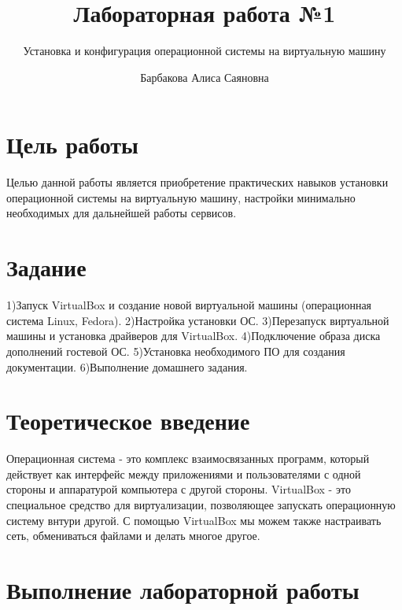 \documentclass[
  12pt,
  a4paper,
  DIV=11,
  numbers=noendperiod]{scrreprt}
\title{Лабораторная работа №1}
\subtitle{Установка и конфигурация операционной системы на виртуальную
машину}
\author{Барбакова Алиса Саяновна}
\date{}
\renewcommand*\contentsname{Содержание}
\newcommand\contentsname{Содержание}
\begin{document}
\maketitle

\renewcommand*\contentsname{Содержание}
{
\setcounter{tocdepth}{1}
\tableofcontents
}
\listoffigures
\listoftables

\chapter{Цель
работы}\label{ux446ux435ux43bux44c-ux440ux430ux431ux43eux442ux44b}

Целью данной работы является приобретение практических навыков установки
операционной системы на виртуальную машину, настройки минимально
необходимых для дальнейшей работы сервисов.

\chapter{Задание}\label{ux437ux430ux434ux430ux43dux438ux435}

1)Запуск VirtualBox и создание новой виртуальной машины (операционная
система Linux, Fedora). 2)Настройка установки ОС. 3)Перезапуск
виртуальной машины и установка драйверов для VirtualBox. 4)Подключение
образа диска дополнений гостевой ОС. 5)Установка необходимого ПО для
создания документации. 6)Выполнение домашнего задания.

\chapter{Теоретическое
введение}\label{ux442ux435ux43eux440ux435ux442ux438ux447ux435ux441ux43aux43eux435-ux432ux432ux435ux434ux435ux43dux438ux435}

Операционная система - это комплекс взаимосвязанных программ, который
действует как интерфейс между приложениями и пользователями с одной
стороны и аппаратурой компьютера с другой стороны. VirtualBox - это
специальное средство для виртуализации, позволяющее запускать
операционную систему внтури другой. С помощью VirtualBox мы можем также
настраивать сеть, обмениваться файлами и делать многое другое.

\chapter{Выполнение лабораторной
работы}\label{ux432ux44bux43fux43eux43bux43dux435ux43dux438ux435-ux43bux430ux431ux43eux440ux430ux442ux43eux440ux43dux43eux439-ux440ux430ux431ux43eux442ux44b}
\end{document}
